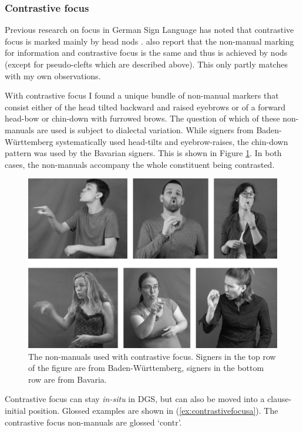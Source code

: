 \largerpage
\subsubsection{Contrastive focus}\label{contrastivefocussubection}
Previous research on focus in German Sign Language has noted that contrastive focus is marked mainly by head nods \citep{waleschkowski2009}. \citet[402--403]{happ2014vork} also report that the non-manual marking for information and contrastive focus is the same and thus is achieved by nods (except for pseudo-clefts which are described above). This only partly matches with my own observations. 

With contrastive focus I found a unique bundle of non-manual markers that consist either of the head tilted backward and raised eyebrows or of a forward head-bow or chin-down with furrowed brows. The question of which of these non-manuals are used is subject to dialectal variation. While signers from Baden-Württemberg systematically used head-tilts and eyebrow-raises, the chin-down pattern was used by the Bavarian signers. This is shown in Figure \ref{contrastivefocus}. In both cases, the non-manuals accompany the whole constituent being contrasted.

\begin{figure}[bt]
\centering
	\includegraphics[width=1.0\textwidth]{contrastivefocus2sw.jpg}
	\caption{The non-manuals used with contrastive focus. Signers in the top row of the figure are from Baden-Württemberg, signers in the bottom row are from Bavaria.}
	\label{contrastivefocus}
\end{figure}

Contrastive focus can stay \textit{in-situ} in DGS, but can also be moved into a clause-initial position. Glossed examples are shown in (\ref{ex:contrastivefocusa}). The contrastive focus non-manuals are glossed `contr'.

